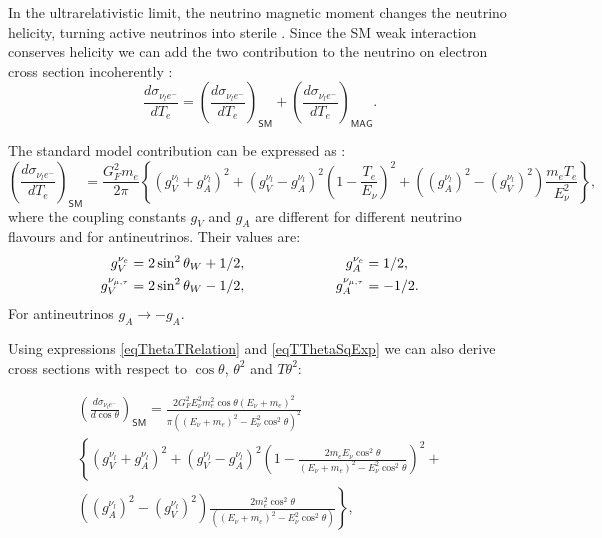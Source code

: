 In the ultrarelativistic limit, the neutrino magnetic moment changes the neutrino helicity, turning active neutrinos into sterile . Since the SM weak interaction conserves helicity we can add the two contribution to the neutrino on electron cross section incoherently \cite{nuElmagInt2015.pdf}:
\begin{equation}
\frac{d\sigma_{\nu_le^-}}{dT_e}=\left(\frac{d\sigma_{\nu_le^-}}{dT_e}\right)_{\textsf{SM}}+\left(\frac{d\sigma_{\nu_le^-}}{dT_e}\right)_{\textsf{MAG}}.
\end{equation}

The standard model contribution can be expressed as \cite{nuElmagInt2015.pdf}:
\begin{equation}
\left(\frac{d\sigma_{\nu_le^-}}{dT_e}\right)_{\textsf{SM}}=\frac{G_F^2m_e}{2\pi}\left\lbrace\left(g_V^{\nu_l}+g_A^{\nu_l}\right)^2+\left(g_V^{\nu_l}-g_A^{\nu_l}\right)^2\left(1-\frac{T_e}{E_{\nu}}\right)^2+\left(\left(g_A^{\nu_l}\right)^2-\left(g_V^{\nu_l}\right)^2\right)\frac{m_eT_e}{E_{\nu}^2}\right\rbrace,
\end{equation}
where the coupling constants $g_V$ and $g_A$ are different for different neutrino flavours and for antineutrinos. Their values are:
\begin{align}
g_V^{\nu_e}&=2\sin^2\theta_W+1/2,\hspace{2.5cm} g_A^{\nu_e}=1/2,\\
g_V^{\nu_{\mu,\tau}}&=2\sin^2\theta_W-1/2,\hspace{2.25cm} g_A^{\nu_{\mu,\tau}}=-1/2.
\end{align}
For antineutrinos $g_A\rightarrow -g_A$.

Using expressions \ref{eqThetaTRelation} and \ref{eqTThetaSqExp} we can also derive \cite{NuOnECrossSections1989.pdf} cross sections with respect to $\cos\theta$, $\theta^2$ and $T\theta^2$:

\begin{multline}
\left(\frac{d\sigma_{\nu_le^-}}{d\cos\theta}\right)_{\textsf{SM}}=
\frac{2G_F^2E_{\nu}^2m_e^2\cos\theta\left(E_{\nu}+m_e\right)^2}{\pi\left(\left(E_{\nu}+m_e\right)^2-E_{\nu}^2\cos^2\theta\right)^2}\\
\left\lbrace\left(g_V^{\nu_l}+g_A^{\nu_l}\right)^2 +
\left(g_V^{\nu_l}-g_A^{\nu_l}\right)^2\left(1-\frac{2m_eE_{\nu}\cos^2\theta}{\left(E_{\nu}+m_e\right)^2-E_{\nu}^2\cos^2\theta}\right)^2\right. +\\
\left.\left(\left(g_A^{\nu_l}\right)^2-\left(g_V^{\nu_l}\right)^2\right)
\frac{2m_e^2\cos^2\theta}{\left(\left(E_{\nu}+m_e\right)^2-E_{\nu}^2\cos^2\theta\right)}\right\rbrace,
\end{multline}
 
